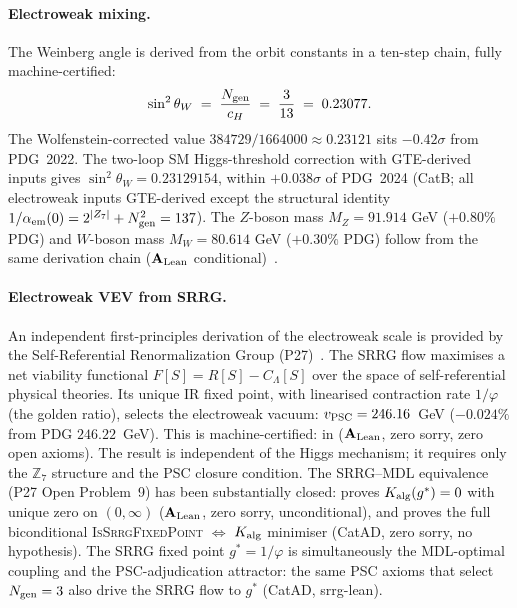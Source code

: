 \paragraph{Electroweak mixing.}
The Weinberg angle is derived from the orbit constants in a ten-step chain, fully
machine-certified:
\[
  \sin^2\theta_W \;=\; \frac{N_{\rm gen}}{c_H} \;=\; \frac{3}{13} \;=\; 0.23077.
\]
The Wolfenstein-corrected value $384729/1664000 \approx 0.23121$ sits $-0.42\sigma$ from PDG~2022.
The two-loop SM Higgs-threshold correction with GTE-derived inputs gives
$\sin^2\theta_W = 0.23129154$, within $+0.038\sigma$ of PDG~2024
(CatB; all electroweak inputs GTE-derived except the structural identity
$1/\alpha_{\rm em}(0) = 2^{|Z_7|} + N_{\rm gen}^2 = 137$).
The $Z$-boson mass $M_Z = 91.914$
GeV ($+0.80\%$ PDG) and $W$-boson mass $M_W = 80.614$ GeV ($+0.30\%$ PDG) follow
from the same derivation chain ($\mathbf{A}_{\rm Lean}$
conditional)~\cite{SpivackWeinbergAngle}.

\paragraph{Electroweak VEV from SRRG.}
An independent first-principles derivation of the electroweak scale is
provided by the Self-Referential Renormalization Group (P27)~\cite{SpivackSRRG}.
The SRRG flow maximises a net viability functional $F[S] = R[S] - C_\Lambda[S]$
over the space of self-referential physical theories.  Its unique IR fixed
point, with linearised contraction rate $1/\varphi$ (the golden ratio), selects
the electroweak vacuum: $v_{\rm PSC} = 246.16$~GeV ($-0.024\%$ from PDG
$246.22$~GeV).  This is machine-certified:
 in 
($\mathbf{A}_{\rm Lean}$, zero sorry, zero open axioms).
The result is independent of the Higgs mechanism; it requires only the $\mathbb{Z}_7$
structure and the PSC closure condition.
The SRRG--MDL equivalence (P27 Open Problem~9) has been substantially closed:
 proves $K_{\rm alg}(g^*) = 0$ with unique zero on
$(0,\infty)$ ($\mathbf{A}_{\rm Lean}$, zero sorry, unconditional), and
 proves the full biconditional
\textsc{IsSrrgFixedPoint} $\Leftrightarrow$ $K_{\rm alg}$ minimiser (CatAD, zero sorry,
no hypothesis).  The SRRG fixed point $g^* = 1/\varphi$ is simultaneously the MDL-optimal
coupling and the PSC-adjudication attractor: the same PSC axioms that select $N_{\rm gen}=3$
also drive the SRRG flow to $g^*$ (CatAD, srrg-lean).


